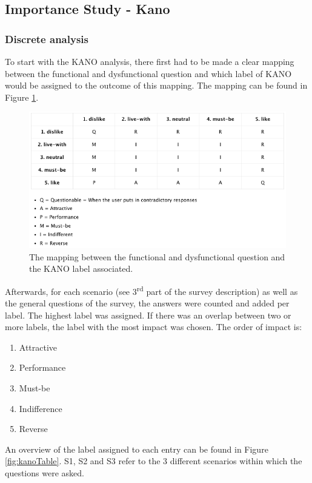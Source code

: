 \subsection{Importance Study - Kano}
\subsubsection{Discrete analysis}
To start with the KANO analysis, there first had to be made a clear mapping between the functional and dysfunctional question and which label of KANO would be assigned to the outcome of this mapping. The mapping can be found in Figure \ref{fig:kanoOverview}.
\begin{figure}[htb!]
	\centering
	\includegraphics[width=\linewidth]{../LaTeX/Figures/Kano/KANOOverview.png}
	\caption{The mapping between the functional and dysfunctional question and the KANO label associated.}
	\label{fig:kanoOverview}
\end{figure}
\break
\break
Afterwards, for each scenario (see 3\textsuperscript{rd} part of the survey description) as well as the general questions of the survey, the answers were counted and added per label. The highest label was assigned. If there was an overlap between two or more labels, the label with the most impact was chosen. The order of impact is:
\begin{enumerate}
	\item Attractive
	\item Performance
	\item Must-be
	\item Indifference
	\item Reverse
\end{enumerate}
An overview  of the label assigned to each entry can be found in Figure \ref{fig:kanoTable}. S1, S2 and S3 refer to the 3 different scenarios within which the questions were asked.

